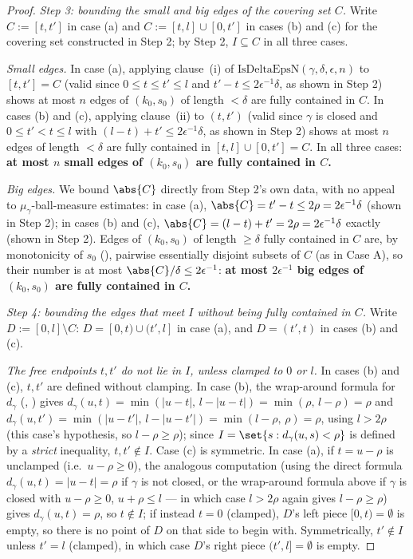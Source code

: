 \begin{proof}
  \emph{Step 3: bounding the small and big edges of the covering set $C$.} Write $C := [t,t']$ in
  case (a) and $C := [t,l]\cup[0,t']$ in cases (b) and (c) for the covering set constructed in
  Step 2; by Step 2, $I \subseteq C$ in all three cases.

  \emph{Small edges.} In case (a), applying clause~(i) of $\mathrm{IsDeltaEpsN}(\gamma,\delta,
  \epsilon,n)$ to $[t,t']=C$ (valid since $0\le t\le t'\le l$ and $t'-t\le 2\epsilon^{-1}\delta$, as
  shown in Step 2) shows at most $n$ edges of $(k_0,s_0)$ of length $<\delta$ are fully contained
  in $C$. In cases (b) and (c), applying clause~(ii) to $(t,t')$ (valid since $\gamma$ is closed
  and $0\le t' < t \le l$ with $(l-t)+t'\le 2\epsilon^{-1}\delta$, as shown in Step 2) shows at most
  $n$ edges of length $<\delta$ are fully contained in $[t,l]\cup[0,t']=C$. In all three cases:
  \textbf{at most $n$ small edges of $(k_0,s_0)$ are fully contained in $C$.}

  \emph{Big edges.} We bound $\abs{C}$ directly from Step 2's own data, with no appeal to
  $\mu_\gamma$-ball-measure estimates: in case (a), $\abs{C}=t'-t\leq 2\rho=2\epsilon^{-1}\delta$
  (shown in Step 2); in cases (b) and (c), $\abs{C}=(l-t)+t'=2\rho=2\epsilon^{-1}\delta$ exactly
  (shown in Step 2). Edges of $(k_0,s_0)$ of length $\geq\delta$ fully contained in $C$ are, by
  monotonicity of $s_0$ (), pairwise essentially disjoint subsets of
  $C$ (as in Case A), so their number is at most $\abs{C}/\delta \leq 2\epsilon^{-1}$: \textbf{at
  most $2\epsilon^{-1}$ big edges of $(k_0,s_0)$ are fully contained in $C$.}

  \emph{Step 4: bounding the edges that meet $I$ without being fully contained in $C$.} Write $D :=
  [0,l]\setminus C$: $D = [0,t)\cup(t',l]$ in case (a), and $D=(t',t)$ in cases (b) and (c).

  \emph{The free endpoints $t,t'$ do not lie in $I$, unless clamped to $0$ or $l$.} In cases (b)
  and (c), $t,t'$ are defined without clamping. In case (b), the wrap-around formula for $d_\gamma$
  (, ) gives $d_\gamma(u,t) = \min(|u-t|,\,l-|u-t|) =
  \min(\rho,\,l-\rho) = \rho$ and $d_\gamma(u,t') = \min(|u-t'|,\,l-|u-t'|) = \min(l-\rho,\,\rho) =
  \rho$, using $l>2\rho$ (this case's hypothesis, so $l-\rho\ge\rho$); since $I = \set{s :
  d_\gamma(u,s)<\rho}$ is defined by a \emph{strict} inequality, $t,t'\notin I$. Case (c) is
  symmetric. In case (a), if $t=u-\rho$ is unclamped (i.e.\ $u-\rho\ge0$), the analogous
  computation (using the direct formula $d_\gamma(u,t)=|u-t|=\rho$ if $\gamma$ is not closed, or
  the wrap-around formula above if $\gamma$ is closed with $u-\rho\ge0$, $u+\rho\le l$ — in which
  case $l>2\rho$ again gives $l-\rho\ge\rho$) gives $d_\gamma(u,t)=\rho$, so $t\notin I$; if instead
  $t=0$ (clamped), $D$'s left piece $[0,t)=\emptyset$ is empty, so there is no point of $D$ on that
  side to begin with. Symmetrically, $t'\notin I$ unless $t'=l$ (clamped), in which case $D$'s
  right piece $(t',l]=\emptyset$ is empty.


\end{proof}
